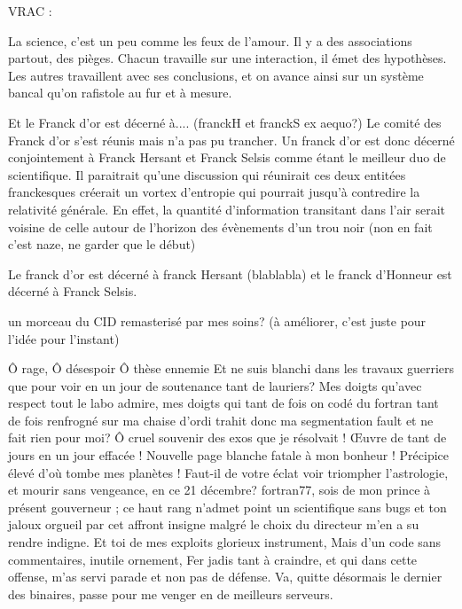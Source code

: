 


VRAC : 

La science, c'est un peu comme les feux de l'amour. Il y a des associations partout, des pièges. Chacun travaille sur une interaction, il émet des hypothèses. Les autres travaillent avec ses conclusions, et on avance ainsi sur un système bancal qu'on rafistole au fur et à mesure.

Et le Franck d'or est décerné à.... (franckH et franckS ex aequo?)
Le comité des Franck d'or s'est réunis mais n'a pas pu trancher. Un franck d'or est donc décerné conjointement à Franck Hersant et Franck Selsis comme étant le meilleur duo de scientifique. Il paraitrait qu'une discussion qui réunirait ces deux entitées franckesques créerait un vortex d'entropie qui pourrait jusqu'à contredire la relativité générale. En effet, la quantité d'information transitant dans l'air serait voisine de celle autour de l'horizon des évènements d'un trou noir (non en fait c'est naze, ne garder que le début)

Le franck d'or est décerné à franck Hersant (blablabla) et le franck d'Honneur est décerné à Franck Selsis.

un morceau du CID remasterisé par mes soins? (à améliorer, c'est juste pour l'idée pour l'instant)


Ô rage, Ô désespoir Ô thèse ennemie
Et ne suis blanchi dans les travaux guerriers
que pour voir en un jour de soutenance tant de lauriers? 
Mes doigts qu'avec respect tout le labo admire, 
mes doigts qui tant de fois on codé du fortran
tant de fois renfrogné sur ma chaise d'ordi
trahit donc ma segmentation fault et ne fait rien pour moi? 
Ô cruel souvenir des exos que je résolvait !
Œuvre de tant de jours en un jour effacée !
Nouvelle page blanche fatale à mon bonheur !
Précipice élevé d'où tombe mes planètes !
Faut-il de votre éclat voir triompher l'astrologie, 
et mourir sans vengeance, en ce 21 décembre? 
fortran77, sois de mon prince à présent gouverneur ; 
ce haut rang n'admet point un scientifique sans bugs
et ton jaloux orgueil par cet affront insigne
malgré le choix du directeur m'en a su rendre indigne. 
Et toi de mes exploits glorieux instrument, 
Mais d'un code sans commentaires, inutile ornement, 
Fer jadis tant à craindre, et qui dans cette offense, 
m'as servi parade et non pas de défense. 
Va, quitte désormais le dernier des binaires,
passe pour me venger en de meilleurs serveurs.